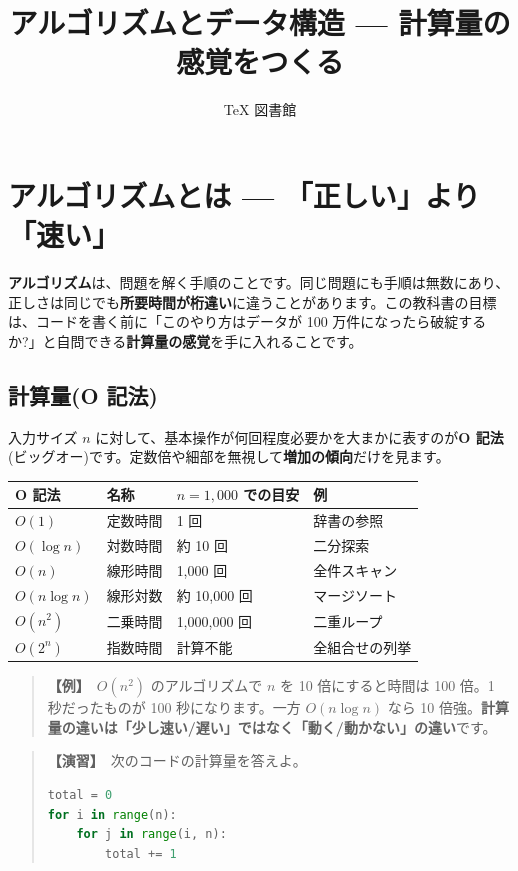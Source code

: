 \documentclass{article}
\title{アルゴリズムとデータ構造 — 計算量の感覚をつくる}
\author{TeX 図書館}
\begin{document}
\section{アルゴリズムとは — 「正しい」より「速い」}

\textbf{アルゴリズム}は、問題を解く手順のことです。同じ問題にも手順は無数にあり、正しさは同じでも\textbf{所要時間が桁違い}に違うことがあります。この教科書の目標は、コードを書く前に「このやり方はデータが 100 万件になったら破綻するか?」と自問できる\textbf{計算量の感覚}を手に入れることです。

\subsection{計算量(O 記法)}

入力サイズ \(n\) に対して、基本操作が何回程度必要かを大まかに表すのが\textbf{O 記法}(ビッグオー)です。定数倍や細部を無視して\textbf{増加の傾向}だけを見ます。

\begin{center}
\begin{tabular}{|l|l|l|l|}
\hline
O 記法 & 名称 & \(n = 1{,}000\) での目安 & 例 \\
\hline
\(O(1)\) & 定数時間 & 1 回 & 辞書の参照 \\
\(O(\log n)\) & 対数時間 & 約 10 回 & 二分探索 \\
\(O(n)\) & 線形時間 & 1,000 回 & 全件スキャン \\
\(O(n \log n)\) & 線形対数 & 約 10,000 回 & マージソート \\
\(O(n^2)\) & 二乗時間 & 1,000,000 回 & 二重ループ \\
\(O(2^n)\) & 指数時間 & 計算不能 & 全組合せの列挙 \\
\hline
\end{tabular}
\end{center}

\begin{quote}
\textbf{【例】}\ \(O(n^2)\) のアルゴリズムで \(n\) を 10 倍にすると時間は 100 倍。1 秒だったものが 100 秒になります。一方 \(O(n \log n)\) なら 10 倍強。\textbf{計算量の違いは「少し速い/遅い」ではなく「動く/動かない」の違い}です。
\end{quote}

\begin{quote}
\textbf{【演習】}\ 次のコードの計算量を答えよ。
\begin{lstlisting}[language=Python]
total = 0
for i in range(n):
    for j in range(i, n):
        total += 1
\end{lstlisting}
\end{quote}
\end{document}
